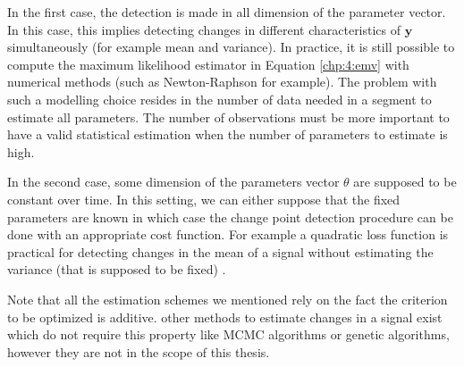 In the first case,  the detection is made in all dimension of the parameter vector. In this case, this implies detecting changes in different characteristics of $\bm y$ simultaneously (for example mean and variance). In practice, it is still possible to compute the maximum likelihood estimator in Equation \ref{chp:4:emv} with numerical methods (such as Newton-Raphson for example). The problem with such a modelling choice resides in the number of data needed in a segment to estimate all parameters. The number of observations must be more important to have a valid statistical estimation when the number of parameters to estimate is high.  

In the second case, some dimension of the parameters vector $\theta$ are supposed to be constant over time. In this setting, we can either suppose that the fixed parameters are known in which case the change point detection procedure can be done with an appropriate cost function. For example a quadratic loss function is practical for detecting changes in the mean of a signal without estimating the variance (that is supposed to be fixed) \citep{Fearnhead2018a}. 


Note that all the estimation schemes we mentioned rely on the fact the criterion to be optimized is additive. other methods to estimate changes in a signal exist which do not require this property like MCMC algorithms \citep{Lavielle2001} or genetic algorithms, however they are not in the scope of this thesis.  

